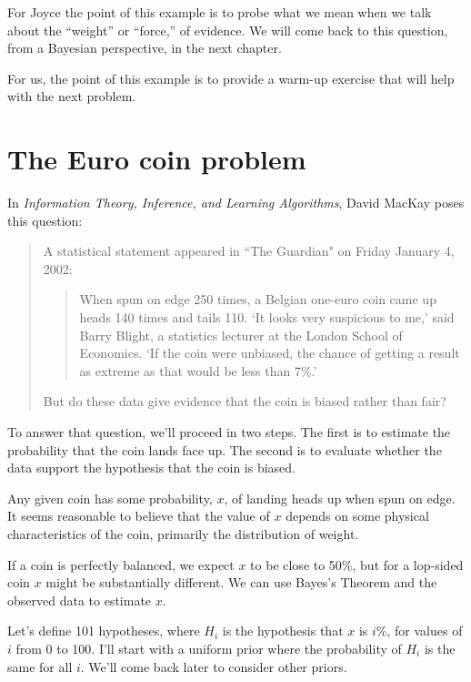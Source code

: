 \documentclass[12pt]{book}
\begin{document}
For Joyce the point of this example is to probe what we mean
when we talk about the ``weight'' or ``force,'' of
evidence.  We will come back to this question, from a Bayesian
perspective, in the next chapter.

For us, the point of this example is to provide a warm-up exercise
that will help with the next problem.


\section{The Euro coin problem}

In {\it Information Theory, Inference, and Learning Algorithms}, David MacKay
poses this question:

\begin{quote}
A statistical statement appeared in ``The Guardian" on Friday January 4, 2002:

  \begin{quote}
        When spun on edge 250 times, a Belgian one-euro coin came
        up heads 140 times and tails 110.  `It looks very suspicious
        to me,' said Barry Blight, a statistics lecturer at the London
        School of Economics.  `If the coin were unbiased, the chance of
        getting a result as extreme as that would be less than 7\%.'
        \end{quote}

But do these data give evidence that the coin is biased rather than fair?
\end{quote}

To answer that question, we'll proceed in two steps.  The first
is to estimate the probability that the coin lands face up.  The second
is to evaluate whether the data support the hypothesis that the
coin is biased.

Any given coin has some probability, $x$, of landing heads up when spun
on edge.  It seems reasonable to believe that the value of $x$ depends
on some physical characteristics of the coin, primarily the distribution
of weight.

If a coin is perfectly balanced, we expect $x$ to be close to 50\%, but
for a lop-sided coin $x$ might be substantially different.  We can use
Bayes's Theorem and the observed data to estimate $x$.

Let's define 101 hypotheses, where $H_i$ is the hypothesis that
$x$ is $i$\%, for values of $i$ from 0 to 100.  I'll start with a uniform
prior where the probability of $H_i$ is the same for all $i$.  We'll
come back later to consider other priors.
\end{document}
